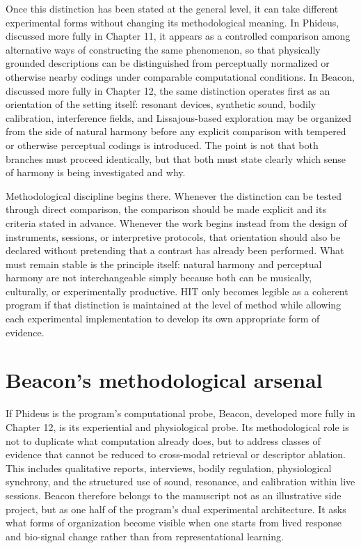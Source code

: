 Once this distinction has been stated at the general level, it can take different experimental forms without changing its methodological meaning. In Phideus, discussed more fully in Chapter 11, it appears as a controlled comparison among alternative ways of constructing the same phenomenon, so that physically grounded descriptions can be distinguished from perceptually normalized or otherwise nearby codings under comparable computational conditions. In Beacon, discussed more fully in Chapter 12, the same distinction operates first as an orientation of the setting itself: resonant devices, synthetic sound, bodily calibration, interference fields, and Lissajous-based exploration may be organized from the side of natural harmony before any explicit comparison with tempered or otherwise perceptual codings is introduced. The point is not that both branches must proceed identically, but that both must state clearly which sense of harmony is being investigated and why.

Methodological discipline begins there. Whenever the distinction can be tested through direct comparison, the comparison should be made explicit and its criteria stated in advance. Whenever the work begins instead from the design of instruments, sessions, or interpretive protocols, that orientation should also be declared without pretending that a contrast has already been performed. What must remain stable is the principle itself: natural harmony and perceptual harmony are not interchangeable simply because both can be musically, culturally, or experimentally productive. HIT only becomes legible as a coherent program if that distinction is maintained at the level of method while allowing each experimental implementation to develop its own appropriate form of evidence.

\section{Beacon's methodological arsenal}

If Phideus is the program's computational probe, Beacon, developed more fully in Chapter 12, is its experiential and physiological probe. Its methodological role is not to duplicate what computation already does, but to address classes of evidence that cannot be reduced to cross-modal retrieval or descriptor ablation. This includes qualitative reports, interviews, bodily regulation, physiological synchrony, and the structured use of sound, resonance, and calibration within live sessions. Beacon therefore belongs to the manuscript not as an illustrative side project, but as one half of the program's dual experimental architecture. It asks what forms of organization become visible when one starts from lived response and bio-signal change rather than from representational learning.

